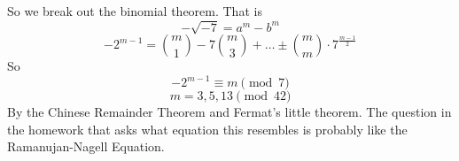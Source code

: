 \documentclass{article}
\begin{document}
So we break out the binomial theorem. That is
\[ -\sqrt{-7} = a^m - b^m  \]
\[ -2^{m-1} = \binom{m}{1}- 7 \binom{m}{3}+\ldots \pm \binom{m}{m} \cdot
7^{\frac{m-1}{2}} \]
So
\[ -2^{m-1} \equiv m \pmod{7} \]
\[ m = 3,5,13 \pmod{42} \]
By the Chinese Remainder Theorem and Fermat's little theorem. 
The question in the homework that asks what equation this resembles is probably
like the Ramanujan-Nagell Equation. 
\end{document}

